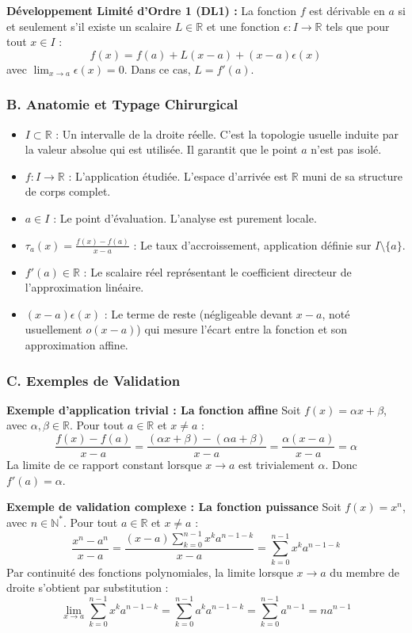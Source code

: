 \documentclass[11pt,a4paper]{article}
\begin{document}
\textbf{Développement Limité d'Ordre 1 (DL1) :}
La fonction $f$ est dérivable en $a$ si et seulement s'il existe un scalaire $L \in \mathbb{R}$ et une fonction $\epsilon : I \to \mathbb{R}$ tels que pour tout $x \in I$ :
\[  f(x) = f(a) + L(x - a) + (x - a)\epsilon(x)  \]
avec $\lim_{x \to a} \epsilon(x) = 0$. Dans ce cas, $L = f'(a)$.

\subsubsection*{B. Anatomie et Typage Chirurgical}

\begin{itemize}
\item $I \subset \mathbb{R}$ : Un intervalle de la droite réelle. C'est la topologie usuelle induite par la valeur absolue qui est utilisée. Il garantit que le point $a$ n'est pas isolé.
\item $f : I \to \mathbb{R}$ : L'application étudiée. L'espace d'arrivée est $\mathbb{R}$ muni de sa structure de corps complet.
\item $a \in I$ : Le point d'évaluation. L'analyse est purement locale.
\item $\tau_a(x) = \frac{f(x) - f(a)}{x - a}$ : Le taux d'accroissement, application définie sur $I \setminus \{a\}$.
\item $f'(a) \in \mathbb{R}$ : Le scalaire réel représentant le coefficient directeur de l'approximation linéaire.
\item $(x - a)\epsilon(x)$ : Le terme de reste (négligeable devant $x-a$, noté usuellement $o(x-a)$) qui mesure l'écart entre la fonction et son approximation affine.
\end{itemize}

\subsubsection*{C. Exemples de Validation}

\textbf{Exemple d'application trivial : La fonction affine}
Soit $f(x) = \alpha x + \beta$, avec $\alpha, \beta \in \mathbb{R}$.
Pour tout $a \in \mathbb{R}$ et $x \neq a$ :
\[  \frac{f(x) - f(a)}{x - a} = \frac{(\alpha x + \beta) - (\alpha a + \beta)}{x - a} = \frac{\alpha(x - a)}{x - a} = \alpha  \]
La limite de ce rapport constant lorsque $x \to a$ est trivialement $\alpha$. Donc $f'(a) = \alpha$.

\textbf{Exemple de validation complexe : La fonction puissance}
Soit $f(x) = x^n$, avec $n \in \mathbb{N}^*$. Pour tout $a \in \mathbb{R}$ et $x \neq a$ :
\[  \frac{x^n - a^n}{x - a} = \frac{(x-a)\sum_{k=0}^{n-1} x^k a^{n-1-k}}{x-a} = \sum_{k=0}^{n-1} x^k a^{n-1-k}  \]
Par continuité des fonctions polynomiales, la limite lorsque $x \to a$ du membre de droite s'obtient par substitution :
\[  \lim_{x \to a} \sum_{k=0}^{n-1} x^k a^{n-1-k} = \sum_{k=0}^{n-1} a^k a^{n-1-k} = \sum_{k=0}^{n-1} a^{n-1} = n a^{n-1}  \]
\end{document}

